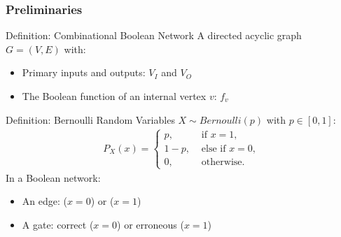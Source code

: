 \begin{frame}
  \frametitle{Preliminaries}
  \begin{block}{Definition: Combinational Boolean Network}
    A directed acyclic graph $G=(V,E)$ with:
    \begin{itemize}
      \item Primary inputs and outputs: $V_I$ and $V_O$
      \item The Boolean function of an internal vertex $v$: $f_v$
    \end{itemize}
  \end{block}
  \pause
  \begin{block}{Definition: Bernoulli Random Variables}
    $X\sim\textit{Bernoulli}(p)$ with $p\in[0,1]$:
    \begin{align*}
      P_X(x)=
      \left\{
      \begin{array}{ll}
        p,   & \mbox{ if } x = 1,      \\
        1-p, & \mbox{ else if } x = 0, \\
        0,   & \mbox{ otherwise. }
      \end{array}
      \right.
    \end{align*}
    In a Boolean network:
    \begin{itemize}
      \item An edge: \false ($x=0$) or \true ($x=1$)
      \item A gate: correct ($x=0$) or erroneous ($x=1$)
    \end{itemize}
  \end{block}
\end{frame}
